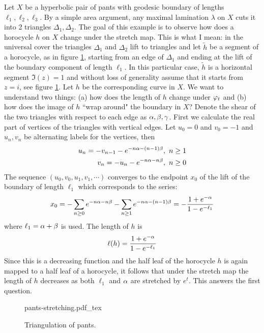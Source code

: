 \begin{exmp}
  Let $X$ be a hyperbolic pair of pants with geodesic boundary of lengths $\ell_1, \ell_2,\ell_3$. By a simple area argument, any maximal lamination $\lambda$ on $X$ cuts it into 2 triangles $\Delta_1, \Delta_2$. The goal of this example is to observe how does a horocycle $h$ on $X$ change under the stretch map. This is what I mean: in the universal cover the triangles $\Delta_1$ and $\Delta_2$ lift to triangles and let $\tilde{h}$ be a segment of a horocycle, as in figure \ref{fig:pants-stretched}, starting from an edge of $\Delta_1$ and ending at the lift of the boundary component of length $\ell_1$. In this particular case, $\tilde{h}$ is a horizontal segment $\Im(z) = 1$ and without loss of generality assume that it starts from $z= i$, see figure \ref{fig:pants-stretched}. Let $h$ be the corresponding curve in $X$. We want to understand two things: (a) how does the length of $h$ change under $\varphi_t$ and (b) how does the image of $h$ ``wrap around" the boundary in $X$? Denote the shear of the two triangles with respect to each edge as $\alpha,\beta,\gamma$. First we calculate the real part of vertices of the triangles with vertical edges. Let $u_0 = 0$ and $v_0 = -1$ and $u_n,v_n$ be alternating labels for the vertices, then 
  \begin{align*}
    u_n = -v_{n-1} - e^{-n\alpha - (n-1)\beta},\ n\geq 1\\
    v_n = -u_n - e^{-n\alpha - n\beta},\ n\geq 0
  \end{align*}
  The sequence $(u_0,v_0,u_1,v_1,\cdots)$ converges to the endpoint $x_0$ of the lift of the boundary of length $\ell_1$ which corresponds to the series:
  \begin{align*}
    x_0 = -\sum_{n\geq 0} e^{-n\alpha -n\beta} - \sum_{n\geq 1} e^{-n\alpha -(n-1)\beta} = -\frac{1+e^{-\alpha}}{1-e^{-\ell_1}}
  \end{align*}
  where $\ell_1 = \alpha+\beta$ is used. The length of $h$ is
  $$\ell(h) = \frac{1+e^{-\alpha}}{1-e^{-\ell_1}}$$
  Since this is a decreasing function and the half leaf of the horocycle $h$ is again mapped to a half leaf of a horocycle, it follows that under the stretch map the length of $h$ decreases as both $\ell_1$ and $\alpha$ are stretched by $e^t$. This answers the first question.\\
  \begin{figure}[t]
    \centering
    \tiny
    \def\svgwidth{\textwidth}
    {pants-stretching.pdf_tex}
    \caption[Triangulation of Pants]{Triangulation of pants.}
    \label{fig:pants-stretched}

\end{figure}
\end{exmp}
